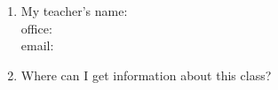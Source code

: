 \documentclass[11pt,fleqn]{article}
\begin{document}
\renewcommand{\headrulewidth}{0pt}
\newcommand{\blank}[1]{\rule{#1}{0.75pt}}
\renewcommand{\d}{\displaystyle}
\vspace*{-0.7in}
\begin{center}
  \large {}
\end{center}


\begin{enumerate}
\item My teacher's name: \underline{\hspace{2in}}\\ 

office:  \underline{\hspace{2in}}\\ 

email:  \underline{\hspace{2in}}\\


\item Where can I get information about this class?\\


\end{enumerate}
\end{document}

